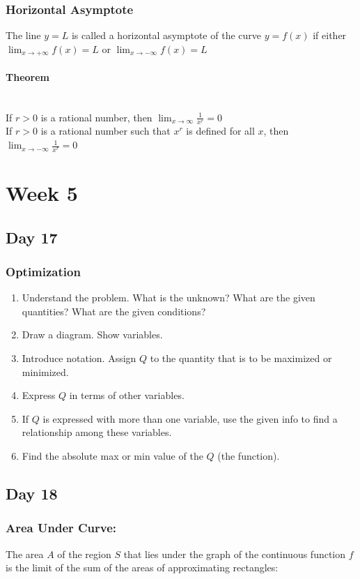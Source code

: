 \documentclass[12pt]{article}
\newcommand{\paragraphNewLine}[1]{\paragraph{#1}\mbox{}\\}
\begin{document}
\subsubsection{Horizontal Asymptote} The line $y=L$ is called a  horizontal asymptote of the curve $y=f(x)$ if either $\lim_{x \to +\infty{}} f(x) = L$ or $\lim_{x \to -\infty{}} f(x) = L$

\paragraphNewLine{Theorem} If $r>0$ is a rational number, then $\lim_{x \to \infty{}} \frac{1}{x^r} = 0$\\
If $r>0$ is a rational number such that $x^r$ is defined for all $x$, then $\lim_{x \to -\infty{}} \frac{1}{x^r} = 0$


\section{Week 5}

\subsection{Day 17} 
\subsubsection{Optimization} 
\begin{enumerate}
    \item Understand the problem. What is the unknown? What are the given quantities? What are the given conditions?
    \item Draw a diagram.  Show variables.
    \item Introduce notation. Assign $Q$ to the quantity that is to be maximized or minimized.
    \item Express $Q$ in terms of other variables.
    \item If $Q$ is expressed with more than one variable, use the given info to find a relationship among these variables.
    \item Find the absolute max or min value of the $Q$ (the function). 
\end{enumerate}


\subsection{Day 18}
\subsubsection{Area Under Curve: } The area $A$ of the region $S$ that lies under the graph of the continuous function $f$ is the limit of the sum of the areas of approximating rectangles:
\end{document}
